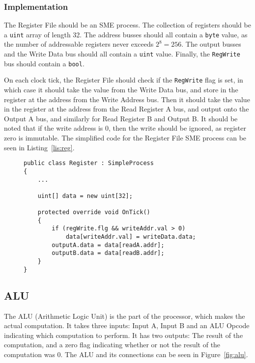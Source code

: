 \subsubsection*{Implementation}
The Register File should be an SME process. The collection of registers should
be a \texttt{uint} array of length 32. The address busses should all contain
a \texttt{byte} value, as the number of addressable registers never exceeds
$2^8=256$. The output busses and the Write Data bus should all contain a
\texttt{uint} value. Finally, the \texttt{RegWrite} bus should contain a
\texttt{bool}.

On each clock tick, the Register File should check if the
\texttt{RegWrite} flag is set, in which case it should take the value from the
Write Data bus, and store in the register at the address from the Write Address
bus. Then it should take the value in the register at the address from the Read
Register A bus, and output onto the Output A bus, and similarly for Read
Register B and Output B. It should be noted that if the write address is 0, then
the write should be ignored, as register zero is immutable. The simplified code
for the Register File SME process can be seen in Listing~\ref{lis:reg}.

\begin{figure}
\begin{lstlisting}[caption=The SME process for the register file., label=lis:reg, captionpos=b]
public class Register : SimpleProcess
{
    ...

    uint[] data = new uint[32];

    protected override void OnTick()
    {
        if (regWrite.flg && writeAddr.val > 0)
            data[writeAddr.val] = writeData.data;
        outputA.data = data[readA.addr];
        outputB.data = data[readB.addr];
    }
}
\end{lstlisting}
\end{figure}

\subsection{ALU}
\label{sec:alu}
The ALU (Arithmetic Logic Unit) is the part of the processor, which makes the
actual computation. It takes three inputs: Input A, Input B and an ALU Opcode
indicating which computation to perform. It has two outputs: The result of the
computation, and a zero flag indicating whether or not the result of the
computation was 0. The ALU and its connections can be seen in
Figure~\ref{fig:alu}.

